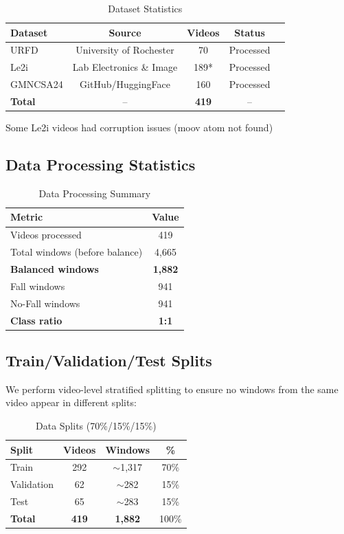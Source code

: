 \documentclass[conference]{IEEEtran}
\begin{document}
\begin{table}[H]
\centering
\caption{Dataset Statistics}
\label{tab:datasets}
\begin{tabular}{lcccc}
\toprule
\textbf{Dataset} & \textbf{Source} & \textbf{Videos} & \textbf{Status} \\
\midrule
URFD & University of Rochester & 70 & Processed \\
Le2i & Lab Electronics \& Image & 189* & Processed \\
GMNCSA24 & GitHub/HuggingFace & 160 & Processed \\
\midrule
\textbf{Total} & -- & \textbf{419} & -- \\
\bottomrule
\end{tabular}
\begin{tablenotes}
\small
\item *Some Le2i videos had corruption issues (moov atom not found)
\end{tablenotes}
\end{table}

\subsection{Data Processing Statistics}

\begin{table}[H]
\centering
\caption{Data Processing Summary}
\label{tab:processing}
\begin{tabular}{lc}
\toprule
\textbf{Metric} & \textbf{Value} \\
\midrule
Videos processed & 419 \\
Total windows (before balance) & 4,665 \\
\textbf{Balanced windows} & \textbf{1,882} \\
Fall windows & 941 \\
No-Fall windows & 941 \\
\textbf{Class ratio} & \textbf{1:1} \\
\bottomrule
\end{tabular}
\end{table}

\subsection{Train/Validation/Test Splits}

We perform video-level stratified splitting to ensure no windows from the same video appear in different splits:

\begin{table}[H]
\centering
\caption{Data Splits (70\%/15\%/15\%)}
\label{tab:splits}
\begin{tabular}{lccc}
\toprule
\textbf{Split} & \textbf{Videos} & \textbf{Windows} & \textbf{\%} \\
\midrule
Train & 292 & $\sim$1,317 & 70\% \\
Validation & 62 & $\sim$282 & 15\% \\
Test & 65 & $\sim$283 & 15\% \\
\midrule
\textbf{Total} & \textbf{419} & \textbf{1,882} & 100\% \\
\bottomrule
\end{tabular}
\end{table}
\end{document}
